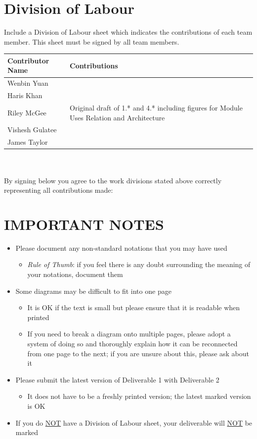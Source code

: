\documentclass[]{article}
\begin{document}
\appendix
\section{Division of Labour}
\label{sec:division_of_labour}
Include a Division of Labour sheet which indicates the contributions of each team member. This sheet must be signed by all team members.

\begin{tabular}{ | l | l | }
\hline
	\textbf{Contributor Name} & \textbf{Contributions}  \\
  	\hline
  	Wenbin Yuan & \\
  	\hline
  	Haris Khan &  \\
  	\hline
  	Riley McGee & Original draft of 1.* and 4.* including figures for Module Uses Relation and Architecture\\
  	\hline
  	Vishesh Gulatee & \\
  	\hline
  	James Taylor & \\
  	\hline
\end{tabular}
\\
\\
By signing below you agree to the work divisions stated above correctly representing all contributions made:



\newpage
\section*{IMPORTANT NOTES}
\begin{itemize}
	\item Please document any non-standard notations that you may have used
	\begin{itemize}
		\item \emph{Rule of Thumb}: if you feel there is any doubt surrounding the meaning of your notations, document them
	\end{itemize}
	\item Some diagrams may be difficult to fit into one page
	\begin{itemize}
		\item It is OK if the text is small but please ensure that it is readable when printed
		\item If you need to break a diagram onto multiple pages, please adopt a system of doing so and thoroughly explain how it can be reconnected from one page to the next; if you are unsure about this, please ask about it
	\end{itemize}
	\item Please submit the latest version of Deliverable 1 with Deliverable 2
	\begin{itemize}
		\item It does not have to be a freshly printed version; the latest marked version is OK
	\end{itemize}
	\item If you do \underline{NOT} have a Division of Labour sheet, your deliverable will \underline{NOT} be marked
\end{itemize}
\end{document}
